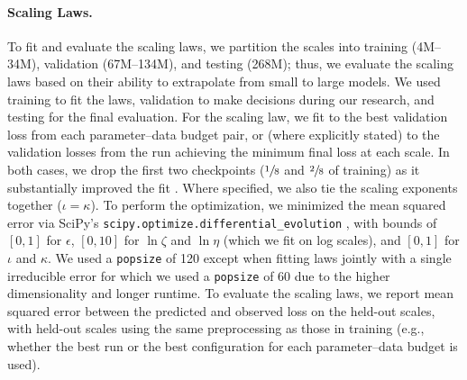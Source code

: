 \paragraph{Scaling Laws.} To fit and evaluate the scaling laws, we partition the scales into training (4M--34M), validation (67M--134M), and testing (268M); thus, we evaluate the scaling laws based on their ability to extrapolate from small to large models. We used training to fit the laws, validation to make decisions during our research, and testing for the final evaluation. For the scaling law, we fit  to the best validation loss from each parameter--data budget pair, or (where explicitly stated) to the validation losses from the run achieving the minimum final loss at each scale. In both cases, we drop the first two checkpoints ($\sfrac{1}{8}$ and $\sfrac{2}{8}$ of training) as it substantially improved the fit \citep{hilton2023scalinglawssingleagentreinforcement}. Where specified, we also tie the scaling exponents together ($\iota = \kappa$). To perform the optimization, we minimized the mean squared error via SciPy's \texttt{scipy.optimize.differential\_evolution} \citep{SciPy2020Virtanen}, with bounds of $[0, 1]$ for $\epsilon$, $[0, 10]$ for $\ln \zeta$ and $\ln \eta$ (which we fit on log scales), and $[0, 1]$ for $\iota$ and $\kappa$. We used a \texttt{popsize} of 120 except when fitting laws jointly with a single irreducible error for which we used a \texttt{popsize} of 60 due to the higher dimensionality and longer runtime. To evaluate the scaling laws, we report mean squared error between the predicted and observed loss on the held-out scales, with held-out scales using the same preprocessing as those in training (e.g., whether the best run or the best configuration for each parameter--data budget is used).

